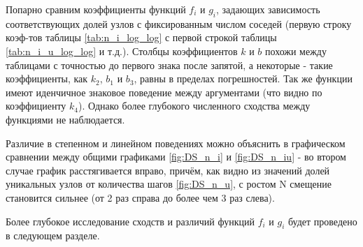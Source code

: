 Попарно сравним коэффициенты функций $f_i$ и $g_i$, задающих зависимость соответствующих долей узлов с фиксированным числом соседей (первую строку коэф-тов таблицы \ref{tab:n_i_log_log} с первой строкой таблицы \ref{tab:n_i_u_log_log} и т.д.). Столбцы коэффициентов $k$ и $b$ похожи между таблицами с точностью до первого знака после запятой, а некоторые - такие коэффициенты, как $k_2$, $b_1$ и $b_3$, равны в пределах погрешностей. Так же функции имеют иденчичное знаковое поведение между аргументами (что видно по коэффициенту $k_4$).
Однако более глубокого численного сходства между функциями не наблюдается.

Различие в степенном и линейном поведениях можно объяснить в графическом сравнении между общими графиками \ref{fig:DS_n_i} и \ref{fig:DS_n_iu} - во втором случае график расстягивается вправо, причём, как видно из значений долей уникальных узлов от количества шагов \ref{fig:DS_n_u}, с ростом N смещение становится сильнее (от 2 раз справа до более чем 3 раз слева).

Более глубокое исследование сходств и различий функций $f_i$ и $g_i$ будет проведено в следующем разделе.


\newpage 